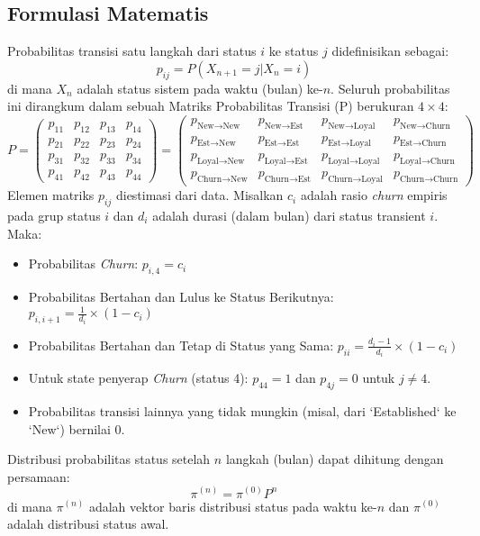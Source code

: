 \documentclass[a4paper,12pt]{article}
\begin{document}
\subsection{Formulasi Matematis}
Probabilitas transisi satu langkah dari status $i$ ke status $j$ didefinisikan sebagai:
\[ p_{ij} = P(X_{n+1} = j | X_n = i) \]
di mana $X_n$ adalah status sistem pada waktu (bulan) ke-$n$. Seluruh probabilitas ini dirangkum dalam sebuah Matriks Probabilitas Transisi (P) berukuran $4 \times 4$:
\[
P = \begin{pmatrix}
p_{11} & p_{12} & p_{13} & p_{14} \\
p_{21} & p_{22} & p_{23} & p_{24} \\
p_{31} & p_{32} & p_{33} & p_{34} \\
p_{41} & p_{42} & p_{43} & p_{44}
\end{pmatrix}
=
\begin{pmatrix}
p_{\text{New} \to \text{New}} & p_{\text{New} \to \text{Est}} & p_{\text{New} \to \text{Loyal}} & p_{\text{New} \to \text{Churn}} \\
p_{\text{Est} \to \text{New}} & p_{\text{Est} \to \text{Est}} & p_{\text{Est} \to \text{Loyal}} & p_{\text{Est} \to \text{Churn}} \\
p_{\text{Loyal} \to \text{New}} & p_{\text{Loyal} \to \text{Est}} & p_{\text{Loyal} \to \text{Loyal}} & p_{\text{Loyal} \to \text{Churn}} \\
p_{\text{Churn} \to \text{New}} & p_{\text{Churn} \to \text{Est}} & p_{\text{Churn} \to \text{Loyal}} & p_{\text{Churn} \to \text{Churn}}
\end{pmatrix}
\]
Elemen matriks $p_{ij}$ diestimasi dari data. Misalkan $c_i$ adalah rasio \textit{churn} empiris pada grup status $i$ dan $d_i$ adalah durasi (dalam bulan) dari status transient $i$. Maka:
\begin{itemize}
    \item Probabilitas \textit{Churn}: $p_{i,4} = c_i$
    \item Probabilitas Bertahan dan Lulus ke Status Berikutnya: $p_{i,i+1} = \frac{1}{d_i} \times (1 - c_i)$
    \item Probabilitas Bertahan dan Tetap di Status yang Sama: $p_{ii} = \frac{d_i - 1}{d_i} \times (1 - c_i)$
    \item Untuk state penyerap \textit{Churn} (status 4): $p_{44} = 1$ dan $p_{4j} = 0$ untuk $j \neq 4$.
    \item Probabilitas transisi lainnya yang tidak mungkin (misal, dari `Established` ke `New`) bernilai 0.
\end{itemize}
Distribusi probabilitas status setelah $n$ langkah (bulan) dapat dihitung dengan persamaan:
\[ \pi^{(n)} = \pi^{(0)} P^n \]
di mana $\pi^{(n)}$ adalah vektor baris distribusi status pada waktu ke-$n$ dan $\pi^{(0)}$ adalah distribusi status awal.
\end{document}
